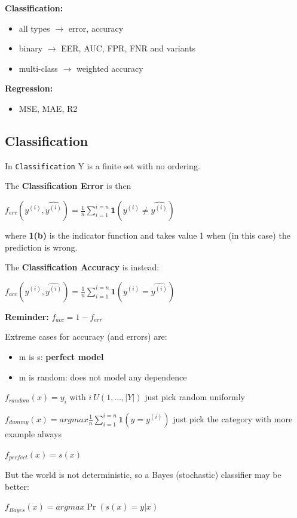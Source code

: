 \begin{exampleblock}
    \textbf{Classification:}
    \begin{itemize}
        \item all types $\to$ error, accuracy 
        \item binary $\to$ EER, AUC, FPR, FNR and variants
        \item multi-class $\to$ weighted accuracy
    \end{itemize}
    \textbf{Regression:}
    \begin{itemize}
        \item MSE, MAE, R2
    \end{itemize}
\end{exampleblock}

\subsection{Classification}

In \texttt{Classification} Y is a finite set with no ordering.

The \textbf{Classification Error} is then 
\begin{center}
    $f_{err}({y^{(i)}, \hat{y^{(i)}}}) = \frac{1}{n}\sum_{i=1}^{i=n}\textbf{1}(y^{(i)} \neq \hat{y^{(i)}})$
\end{center}

where \textbf{1(b)} is the indicator function and takes value 1 when (in this case) the prediction is wrong.

The \textbf{Classification Accuracy} is instead:
\begin{center}
    $f_{acc}({y^{(i)}, \hat{y^{(i)}}}) = \frac{1}{n}\sum_{i=1}^{i=n}\textbf{1}(y^{(i)} = \hat{y^{(i)}})$
\end{center}

\textbf{Reminder:} $f_{acc} = 1 - f_{err}$

Extreme cases for accuracy (and errors) are:
\begin{itemize}
    \item m is s: \textbf{perfect model}
    \item m is random: does not model any dependence
\end{itemize}

\begin{exampleblock}
    $f_{random}(x) = y_i$ with $i ~ U({1, \dots, |Y|})$     just pick random uniformly
\end{exampleblock}
\begin{exampleblock}
    $f_{dummy}(x) = argmax \frac{1}{n} \sum_{i=1}^{i=n}\textbf{1}(y = y^{(i)})$     just pick the category with more example always
\end{exampleblock}
\begin{exampleblock}
    $f_{perfect}(x)= s(x)$
\end{exampleblock}
But the world is not deterministic, so a Bayes (stochastic) classifier may be better:
\begin{exampleblock}
    $f_{Bayes}(x) = argmax \Pr(s(x) = y | x)$
\end{exampleblock}

